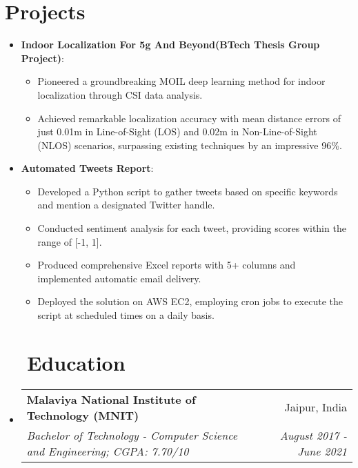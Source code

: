 \documentclass[a4paper,20pt]{article}
\makeatletter
\newcommand{\resumeItem}[2]{
  \item\small{
    \textbf{#1}{: #2 \vspace{-2pt}}
  }
}
\newcommand{\resumeSubheading}[4]{
  \vspace{-1pt}\item
    \begin{tabular*}{0.97\textwidth}{l@{\extracolsep{\fill}}r}
      \textbf{#1} & #2 \\
      \textit{#3} & \textit{#4} \\
    \end{tabular*}\vspace{-5pt}
}
\newcommand{\resumeSubItem}[2]{\resumeItem{#1}{#2}\vspace{-3pt}}
\newcommand{\resumeSubHeadingListStart}{\begin{itemize}[leftmargin=*]}
\newcommand{\resumeSubHeadingListEnd}{\end{itemize}}
\makeatother
\begin{document}
\section{Projects}
\resumeSubHeadingListStart
\resumeSubItem{Indoor Localization For 5g And Beyond(BTech Thesis Group Project)}{}
\vspace{-2pt}
\begin{itemize}[label=$\circ$]
\item Pioneered a groundbreaking MOIL deep learning method for indoor localization through CSI data analysis.
\vspace{-3pt}
\item Achieved remarkable localization accuracy with mean distance errors of just 0.01m in Line-of-Sight (LOS) and 0.02m in Non-Line-of-Sight (NLOS) scenarios, surpassing existing techniques by an impressive 96\%.
\end{itemize}
\vspace{-8pt}
\resumeSubItem{Automated Tweets Report}{}
\vspace{-2pt}
\begin{itemize}[label=$\circ$]
\item Developed a Python script to gather tweets based on specific keywords and mention a designated Twitter handle.
\vspace{-3pt}
\item Conducted sentiment analysis for each tweet, providing scores within the range of [-1, 1].
\vspace{-3pt}
\item Produced comprehensive Excel reports with 5+ columns and implemented automatic email delivery.
\vspace{-3pt}
\item Deployed the solution on AWS EC2, employing cron jobs to execute the script at scheduled times on a daily basis.
\end{itemize}
\vspace{-2pt}
\resumeSubHeadingListEnd

\section{~~Education}
  \resumeSubHeadingListStart
    \resumeSubheading
      {Malaviya National Institute of Technology (MNIT)}{Jaipur, India}
      {Bachelor of Technology - Computer Science and Engineering;  CGPA: 7.70/10}{August 2017 - June 2021}
    \resumeSubHeadingListEnd
	
\end{document}
